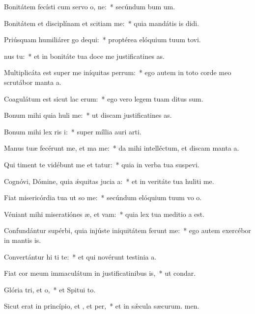 \item Bonitátem fecísti cum servo o, ne:~* secúndum bum um.
\item Bonitátem et disciplínam et scitiam  me:~* quia mandátis is didi.
\item Priúsquam humiliárer go dequi:~* proptérea elóquium tuum tovi.
\item {}nus  tu:~* et in bonitáte tua doce me justificatines as.
\item Multiplicáta est super me iníquitas perrum:~* ego autem in toto corde meo scrutábor manta a.
\item Coagulátum est sicut lac  erum:~* ego vero legem tuam ditus sum.
\item Bonum mihi quia huli me:~* ut discam justificatines as.
\item Bonum mihi lex ris i:~* super míllia auri  arti.
\item Manus tuæ fecérunt me, et ma me:~* da mihi intelléctum, et discam manta a.
\item Qui timent te vidébunt me et tatur:~* quia in verba tua suspevi.
\item Cognóvi, Dómine, quia ǽquitas jucia a:~* et in veritáte tua huliti me.
\item Fiat misericórdia tua ut so me:~* secúndum elóquium tuum vo o.
\item Véniant mihi miseratiónes æ, et vam:~* quia lex tua meditio a est.
\item Confundántur supérbi, quia injúste iniquitátem ferunt  me:~* ego autem exercébor in mantis is.
\item Convertántur hi ti te:~* et qui novérunt testinia a.
\item Fiat cor meum immaculátum in justificatinibus is,~* ut  condar.
\item Glória tri, et o,~* et Spitui to.
\item Sicut erat in princípio, et , et per,~* et in sǽcula sæcurum. men.
